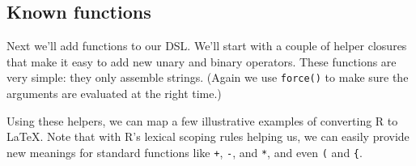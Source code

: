 \begin{Shaded}
\begin{Highlighting}[]
\StringTok{ }
  \StringTok{ }
  \StringTok{ }\NormalTok{(}
  \StringTok{ }

\NormalTok{\}}

\end{Highlighting}
\end{Shaded}

\subsection{Known functions}

Next we'll add functions to our DSL. We'll start with a couple of helper
closures that make it easy to add new unary and binary operators. These
functions are very simple: they only assemble strings. (Again we use
\texttt{force()} to make sure the arguments are evaluated at the right
time.)

\begin{Shaded}
\begin{Highlighting}[]
\StringTok{ }
  \NormalTok{\}}
\NormalTok{\}}

\StringTok{ }
  \NormalTok{\}}
\NormalTok{\}}
\end{Highlighting}
\end{Shaded}

Using these helpers, we can map a few illustrative examples of
converting R to LaTeX. Note that with R's lexical scoping rules helping
us, we can easily provide new meanings for standard functions like
\texttt{+}, \texttt{-}, and \texttt{*}, and even \texttt{(} and
\texttt{\{}.

